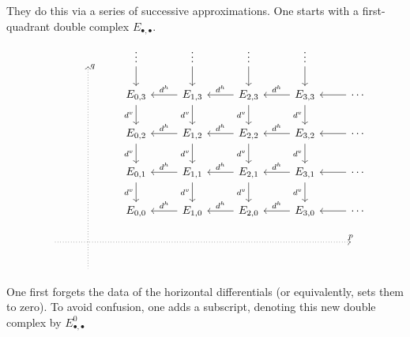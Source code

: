 \documentclass[main.tex]{subfiles}
\begin{document}
They do this via a series of successive approximations. One starts with a first-quadrant double complex $E_{\bullet,\bullet}$.
\begin{equation*}
  \begin{tikzcd}
    & \
    \arrow[dddddd, leftarrow, dotted, at start, "q"]
    & \vdots
    \arrow[d]
    & \vdots
    \arrow[d]
    & \vdots
    \arrow[d]
    & \vdots
    \arrow[d]
    \\
    && E_{0,3}
    \arrow[d, swap, "d^{v}"]
    & E_{1,3}
    \arrow[l, swap, "d^{h}"]
    \arrow[d, swap, "d^{v}"]
    & E_{2,3}
    \arrow[l, swap, "d^{h}"]
    \arrow[d, swap, "d^{v}"]
    & E_{3,3}
    \arrow[l, swap, "d^{h}"]
    \arrow[d, swap, "d^{v}"]
    & \cdots
    \arrow[l]
    \\
    && E_{0,2}
    \arrow[d, swap, "d^{v}"]
    & E_{1,2}
    \arrow[l, swap, "d^{h}"]
    \arrow[d, swap, "d^{v}"]
    & E_{2,2}
    \arrow[l, swap, "d^{h}"]
    \arrow[d, swap, "d^{v}"]
    & E_{3,2}
    \arrow[l, swap, "d^{h}"]
    \arrow[d, swap, "d^{v}"]
    & \cdots
    \arrow[l]
    \\
    && E_{0,1}
    \arrow[d, swap, "d^{v}"]
    & E_{1,1}
    \arrow[l, swap, "d^{h}"]
    \arrow[d, swap, "d^{v}"]
    & E_{2,1}
    \arrow[l, swap, "d^{h}"]
    \arrow[d, swap, "d^{v}"]
    & E_{3,1}
    \arrow[l, swap, "d^{h}"]
    \arrow[d, swap, "d^{v}"]
    & \cdots
    \arrow[l]
    \\
    && E_{0,0}
    & E_{1,0}
    \arrow[l, swap, "d^{h}"]
    & E_{2,0}
    \arrow[l, swap, "d^{h}"]
    & E_{3,0}
    \arrow[l, swap, "d^{h}"]
    & \cdots
    \arrow[l]
    \\
    \
    \arrow[rrrrrr, dotted, at end, "p"]
    &&&&&& \
    \\
    & \
  \end{tikzcd}
\end{equation*}
One first forgets the data of the horizontal differentials (or equivalently, sets them to zero). To avoid confusion, one adds a subscript, denoting this new double complex by $E^{0}_{\bullet,\bullet}$
\end{document}
